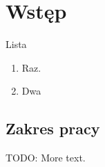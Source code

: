
\rozdzial


\section{Wstęp}


Lista
\begin{enumerate}
\item Raz.
\item Dwa
\end{enumerate}

\subsection{Zakres pracy}

TODO: More text.

